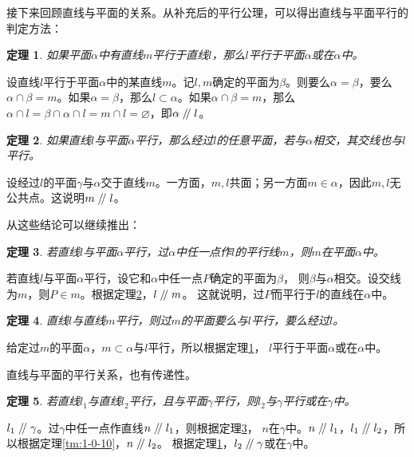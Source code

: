 \documentclass[12pt,UTF8]{ctexbook}
\newtheorem{tm}{定理}[section]
\renewcommand\parallel{\mathrel{/\mskip-4mu/}}
\begin{document}
接下来回顾直线与平面的关系。从补充后的平行公理，可以得出直线与平面平行的判定方法：

\begin{tm}\label{tm:1-0-20}
    如果平面$\alpha$中有直线$m$平行于直线$l$，那么$l$平行于平面$\alpha$或在$\alpha$中。
\end{tm}
\begin{proof2}
    设直线$l$平行于平面$\alpha$中的某直线$m$。记$l,m$确定的平面为$\beta$。则要么$\alpha = \beta$，要么$\alpha\cap\beta = m$。如果$\alpha=\beta$，那么$l\subset\alpha$。如果$\alpha\cap\beta = m$，那么$\alpha\cap l= \beta\cap \alpha\cap l = m\cap l = \varnothing $，即$\alpha \parallel l$。
\end{proof2}
\begin{tm}\label{tm:1-0-30}
    如果直线$l$与平面$\alpha$平行，那么经过$l$的任意平面，若与$\alpha$相交，其交线也与$l$平行。
\end{tm}
\begin{proof2}
    设经过$l$的平面$\gamma$与$\alpha$交于直线$m$。一方面，$m,l$共面；另一方面$m\in\alpha$，因此$m,l$无公共点。这说明$m\parallel l$。
\end{proof2}

从这些结论可以继续推出：
\begin{tm}\label{tm:1-0-40}
    若直线$l$与平面$\alpha$平行，过$\alpha$中任一点作$l$的平行线$m$，则$m$在平面$\alpha$中。
\end{tm}
\begin{proof2}
    若直线$l$与平面$\alpha$平行，设它和$\alpha$中任一点$P$确定的平面为$\beta$，
    则$\beta$与$\alpha$相交。设交线为$m$，则$P\in m$。根据定理\ref{tm:1-0-30}，$l\parallel m$。
    这就说明，过$P$而平行于$l$的直线在$\alpha$中。
\end{proof2}
\begin{tm}\label{tm:1-0-41}
    直线$l$与直线$m$平行，则过$m$的平面要么与$l$平行，要么经过$l$。
\end{tm}
\begin{proof2}
    给定过$m$的平面$\alpha$，$m\subset \alpha$与$l$平行，所以根据定理\ref{tm:1-0-20}，
    $l$平行于平面$\alpha$或在$\alpha$中。
\end{proof2}

直线与平面的平行关系，也有传递性。
\begin{tm}
    若直线$l_1$与直线$l_2$平行，且与平面$\gamma$平行，则$l_2$与$\gamma$平行或在$\gamma$中。
\end{tm}
\begin{proof2}
    $l_1\parallel \gamma$。过$\gamma$中任一点作直线$n\parallel l_1$，则根据定理\ref{tm:1-0-40}，
    $n$在$\gamma$中。$n\parallel l_1$，$l_1\parallel l_2$，所以根据定理\ref{tm:1-0-10}，$n\parallel l_2$。
    根据定理\ref{tm:1-0-20}，$l_2\parallel \gamma$或在$\gamma$中。
\end{proof2}
\end{document}
